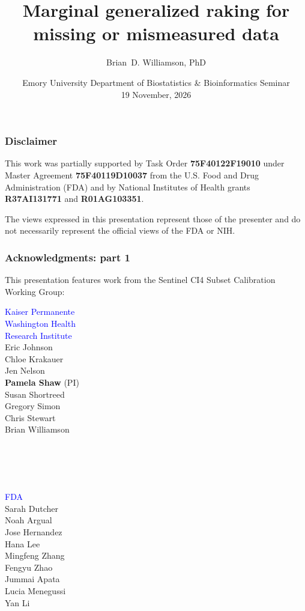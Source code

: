 \documentclass[10pt, table]{beamer}
\title{Marginal generalized raking for missing or mismeasured data}
\author{Brian~D. Williamson, PhD}
\institute{Kaiser Permanente Washington Health Research Institute \\ brian.d.williamson@kp.org}
\date{Emory University Department of Biostatistics \& Bioinformatics Seminar \\ 19 November, 2026}
\begin{document}
\begin{frame}
  \titlepage
\end{frame}

\begin{frame} \frametitle{Disclaimer}
  This work was partially supported by Task Order \textbf{75F40122F19010} under Master Agreement \textbf{75F40119D10037} from the U.S. Food and Drug Administration (FDA) and by National Institutes of Health grants \textbf{R37AI131771} and \textbf{R01AG103351}.

  The views expressed in this presentation represent those of the presenter and do not necessarily represent the official views of the FDA or NIH.
\end{frame}

\begin{frame} \frametitle{Acknowledgments: part 1}
  This presentation features work from the Sentinel CI4 Subset Calibration Working Group:

  \begin{minipage}{0.33\textwidth}
    \vspace{-0.5cm}\textcolor{blue}{Kaiser Permanente \\ Washington Health \\ Research Institute} \\
    Eric Johnson \\
    Chloe Krakauer \\
    Jen Nelson \\
    \textbf{Pamela Shaw} (PI) \\
    Susan Shortreed \\
    Gregory Simon \\
    Chris Stewart \\
    Brian Williamson \\ \\ \\ \\ \\
\end{minipage}%
\begin{minipage}{0.33\textwidth}
    \textcolor{blue}{FDA} \\
    Sarah Dutcher \\
    Noah Argual \\
    Jose Hernandez \\
    Hana Lee \\
    Mingfeng Zhang \\
    Fengyu Zhao \\
    Jummai Apata \\
    Lucia Menegussi \\
    Yan Li \\


\end{minipage}
\end{frame}
\end{document}
